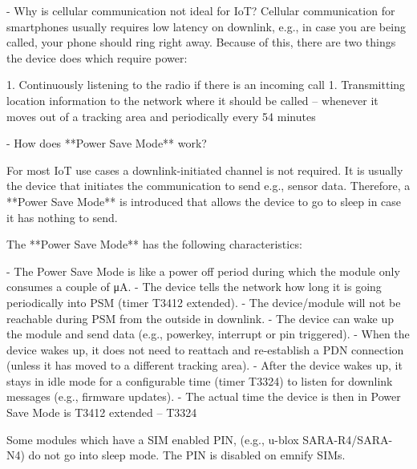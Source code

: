 \documentclass[11pt, oneside]{article}   	%
\newcommand{\addspace}{\vspace{2mm}}
\begin{document}
\addspace
\begin{markdown}
- Why is cellular communication not ideal for IoT?  
Cellular communication for smartphones usually requires low latency on downlink, e.g., in case you are being called, your phone should ring right away.
Because of this, there are two things the device does which require power:  
\end{markdown}
\addspace
\begin{markdown}
  1. Continuously listening to the radio if there is an incoming call
  1. Transmitting location information to the network where it should be called -- whenever it moves out of a tracking area and periodically every 54 minutes
\end{markdown}
\addspace
\begin{markdown}
- How does **Power Save Mode** work?  
\end{markdown}
\addspace
\begin{markdown}
For most IoT use cases a downlink-initiated channel is not required.
It is usually the device that initiates the communication to send e.g., sensor data.
Therefore, a **Power Save Mode** is introduced that allows the device to go to sleep in case it has nothing to send.  
\end{markdown}
\addspace
\begin{markdown}
The **Power Save Mode** has the following characteristics:
\end{markdown}
\addspace
\begin{markdown}
  - The Power Save Mode is like a power off period during which the module only consumes a couple of μA.
  - The device tells the network how long it is going periodically into PSM (timer T3412 extended).
  - The device/module will not be reachable during PSM from the outside in downlink.
  - The device can wake up the module and send data (e.g., powerkey, interrupt or pin triggered).
  - When the device wakes up, it does not need to reattach and re-establish a PDN connection (unless it has moved to a different tracking area).
  - After the device wakes up, it stays in idle mode for a configurable time (timer T3324) to listen for downlink messages (e.g., firmware updates).
  - The actual time the device is then in Power Save Mode is T3412 extended -- T3324
\end{markdown}

\begin{tcolorbox}[colback=blue!5!white,colframe=blue!75!black,title=Note]
Some modules which have a SIM enabled PIN, (e.g., u-blox SARA-R4/SARA-N4) do not go into sleep mode.
  The PIN is disabled on emnify SIMs.
\end{tcolorbox}
\end{document}
